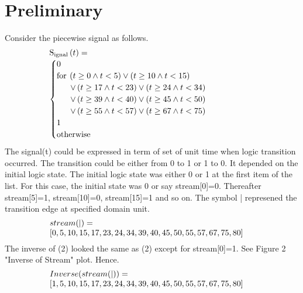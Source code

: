 \documentclass[10pt,journal]{IEEEtran}
\begin{document}
\section{Preliminary}
Consider the piecewise signal as follows.
\begin{equation}
 \begin{minipage}{250pt}
\begin{flushleft} $\displaystyle \operatorname{S_{ignal}}{\left(t \right)} = \begin{cases} 0 & \\  \text{for}\: \left(t \geq 0 \wedge t < 5\right) \vee \left(t \geq 10 \wedge t < 15\right) \\ \quad \ \  \vee \left(t \geq 17 \wedge t < 23\right) \vee \left(t \geq 24 \wedge t < 34\right) \\ \quad \ \  \vee \left(t \geq 39 \wedge t < 40\right) \vee \left(t \geq 45 \wedge t < 50\right) \\ \quad \ \  \vee \left(t \geq 55 \wedge t < 57\right) \vee \left(t \geq 67 \wedge t < 75\right) \\1 & \\  \text{otherwise} \end{cases}$  \end{flushleft}
 \end{minipage}
 \end{equation}
The signal(t) could be expressed in term of set of unit time when logic     transition occurred. The transition could be either from 0 to 1 or 1 to 0.     It depended on the initial logic state. The initial logic state was      either 0 or 1 at the first item of the list. For this case, the initial     state was 0 or say stream[0]=0. Thereafter stream[5]=1, stream[10]=0,     stream[15]=1 and so on. The symbol | represened the transition edge at specified     domain unit.
\begin{equation}
 \begin{minipage}{250pt}
\begin{flushleft} $\displaystyle stream(|) = \newline  [0, 5, 10, 15, 17, 23, 24, 34, 39, 40, 45, 50, 55, 57, 67, 75, 80]$  \end{flushleft}
 \end{minipage}
 \end{equation}
The inverse of (2) looked the same as (2) except for stream[0]=1. See Figure 2 "Inverse of Stream" plot. Hence.
\begin{equation}
 \begin{minipage}{250pt}
\begin{flushleft} $\displaystyle Inverse(stream(|))  = [1, 5, 10, 15, 17, 23, 24, 34, 39, 40, 45, 50, 55, 57, 67, 75, 80]$  \end{flushleft}
 \end{minipage}
 \end{equation}
\end{document}
